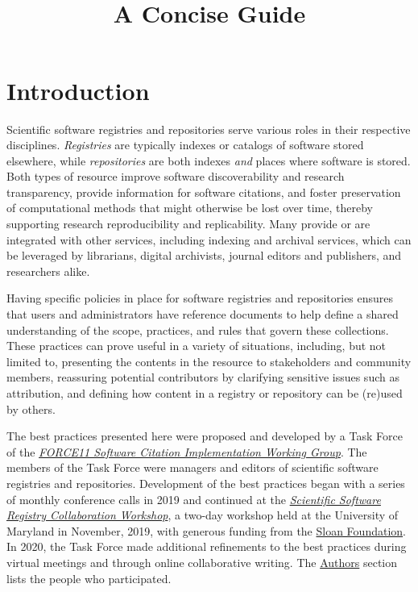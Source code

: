 \documentclass[11pt]{article}
\title{\textls[-27]{Nine Best Practices for Research Software Registries and Repositories:}\\
A Concise Guide}
\author{}
\begin{document}
\maketitle
\tableofcontents

\newcommand{\sectionbreak}{\clearpage}


\section{Introduction}
\label{introduction}

Scientific software registries and repositories serve various roles in their respective disciplines. \emph{Registries} are typically indexes or catalogs of software stored elsewhere, while \emph{repositories} are both indexes \emph{and} places where software is stored. Both types of resource improve software discoverability and research transparency, provide information for software citations, and foster preservation of computational methods that might otherwise be lost over time, thereby supporting research reproducibility and replicability. Many provide or are integrated with other services, including indexing and archival services, which can be leveraged by librarians, digital archivists, journal editors and publishers, and researchers alike.

Having specific policies in place for software registries and repositories ensures that users and administrators have reference documents to help define a shared understanding of the scope, practices, and rules that govern these collections. These practices can prove useful in a variety of situations, including, but not limited to, presenting the contents in the resource to stakeholders and community members, reassuring potential contributors by clarifying sensitive issues such as attribution, and defining how content in a registry or repository can be (re)used by others.

The best practices presented here were proposed and developed by a Task Force of the \href{https://github.com/force11/force11-sciwg}{\emph{FORCE11 Software Citation Implementation Working Group}}.  The members of the Task Force were managers and editors of scientific software registries and repositories.  Development of the best practices began with a series of monthly conference calls in 2019 and continued at the \href{https://asclnet.github.io/SWRegistryWorkshop/}{\emph{Scientific Software Registry Collaboration Workshop}}, a two-day workshop held at the University of Maryland in November, 2019, with generous funding from the \href{https://sloan.org}{Sloan Foundation}. In 2020, the Task Force made additional refinements to the best practices during virtual meetings and through online collaborative writing.  The \hyperref[authors]{Authors} section lists the people who participated.
\end{document}
